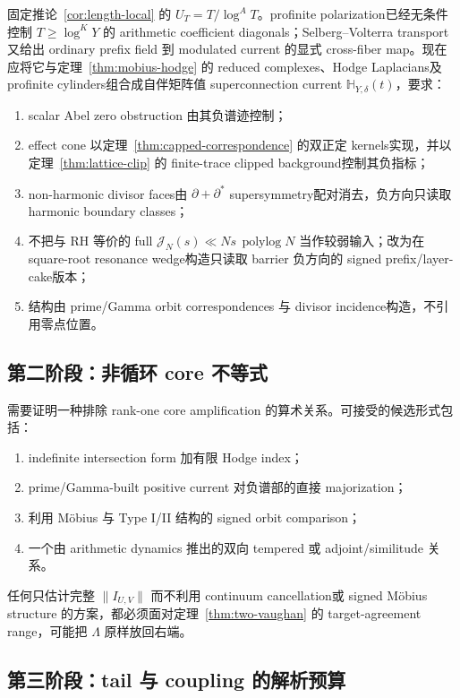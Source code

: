 \documentclass[UTF8,11pt,a4paper]{ctexart}
\theoremstyle{definition}
\theoremstyle{remark}
\newcommand{\1}{\mathbf 1}
\begin{document}
固定推论~\ref{cor:length-local} 的 $U_T=T/\log^A T$。profinite polarization已经无条件控制 $T\geq\log^K Y$ 的 arithmetic coefficient diagonals；Selberg--Volterra transport又给出 ordinary prefix field 到 modulated current 的显式 cross-fiber map。现在应将它与定理~\ref{thm:mobius-hodge} 的 reduced complexes、Hodge Laplacians及 profinite cylinders组合成自伴矩阵值 superconnection current $\mathbb H_{Y,\delta}(t)$，要求：
\begin{enumerate}
  \item scalar Abel zero obstruction 由其负谱迹控制；
  \item effect cone 以定理~\ref{thm:capped-correspondence} 的双正定 kernels实现，并以定理~\ref{thm:lattice-clip} 的 finite-trace clipped background控制其负指标；
  \item non-harmonic divisor faces由 $\partial+\partial^*$ supersymmetry配对消去，负方向只读取 harmonic boundary classes；
  \item 不把与 RH 等价的 full $\mathcal J_N(s)\ll Ns\,\operatorname{polylog}N$ 当作较弱输入；改为在 square-root resonance wedge构造只读取 barrier 负方向的 signed prefix/layer-cake版本；
  \item 结构由 prime/Gamma orbit correspondences 与 divisor incidence构造，不引用零点位置。
\end{enumerate}

\subsection{第二阶段：非循环 core 不等式}

需要证明一种排除 rank-one core amplification 的算术关系。可接受的候选形式包括：
\begin{enumerate}
  \item indefinite intersection form 加有限 Hodge index；
  \item prime/Gamma-built positive current 对负谱部的直接 majorization；
  \item 利用 M\"obius 与 Type I/II 结构的 signed orbit comparison；
  \item 一个由 arithmetic dynamics 推出的双向 tempered 或 adjoint/similitude 关系。
\end{enumerate}
任何只估计完整 $\|I_{U,V}\|$ 而不利用 continuum cancellation或 signed M\"obius structure 的方案，都必须面对定理~\ref{thm:two-vaughan} 的 target-agreement range，可能把 $\Lambda$ 原样放回右端。

\subsection{第三阶段：tail 与 coupling 的解析预算}
\end{document}

